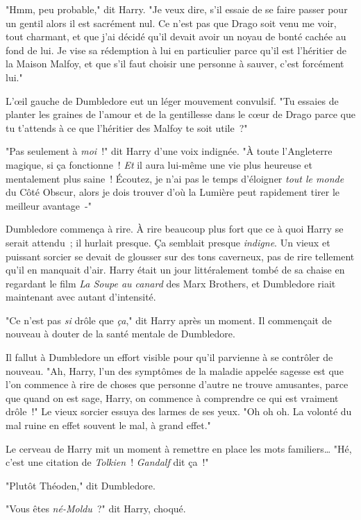 "Hmm, peu probable," dit Harry. "Je veux dire, s'il essaie de se faire passer pour un gentil alors il est sacrément nul. Ce n'est pas que Drago soit venu me voir, tout charmant, et que j'ai décidé qu'il devait avoir un noyau de bonté cachée au fond de lui. Je vise sa rédemption à lui en particulier parce qu'il est l'héritier de la Maison Malfoy, et que s'il faut choisir une personne à sauver, c'est forcément lui."

L'œil gauche de Dumbledore eut un léger mouvement convulsif. "Tu essaies de planter les graines de l'amour et de la gentillesse dans le cœur de Drago parce que tu t'attends à ce que l'héritier des Malfoy te soit utile~?"

"Pas seulement à \emph{moi}~!" dit Harry d'une voix indignée. "À toute l'Angleterre magique, si ça fonctionne~! \emph{Et} il aura lui-même une vie plus heureuse et mentalement plus saine~! Écoutez, je n'ai pas le temps d'éloigner \emph{tout le monde} du Côté Obscur, alors je dois trouver d'où la Lumière peut rapidement tirer le meilleur avantage~-"

Dumbledore commença à rire. À rire beaucoup plus fort que ce à quoi Harry se serait attendu~; il hurlait presque. Ça semblait presque \emph{indigne}. Un vieux et puissant sorcier se devait de glousser sur des tons caverneux, pas de rire tellement qu'il en manquait d'air. Harry était un jour littéralement tombé de sa chaise en regardant le film \emph{La Soupe au canard} des Marx Brothers, et Dumbledore riait maintenant avec autant d'intensité.

"Ce n'est pas \emph{si} drôle que \emph{ça}," dit Harry après un moment. Il commençait de nouveau à douter de la santé mentale de Dumbledore.

Il fallut à Dumbledore un effort visible pour qu'il parvienne à se contrôler de nouveau. "Ah, Harry, l'un des symptômes de la maladie appelée sagesse est que l'on commence à rire de choses que personne d'autre ne trouve amusantes, parce que quand on est sage, Harry, on commence à comprendre ce qui est vraiment drôle~!" Le vieux sorcier essuya des larmes de ses yeux. "Oh oh oh. La volonté du mal ruine en effet souvent le mal, à grand effet."

Le cerveau de Harry mit un moment à remettre en place les mots familiers… "Hé, c'est une citation de \emph{Tolkien}~! \emph{Gandalf} dit ça~!"

"Plutôt Théoden," dit Dumbledore.

"Vous êtes \emph{né-Moldu}~?" dit Harry, choqué.


